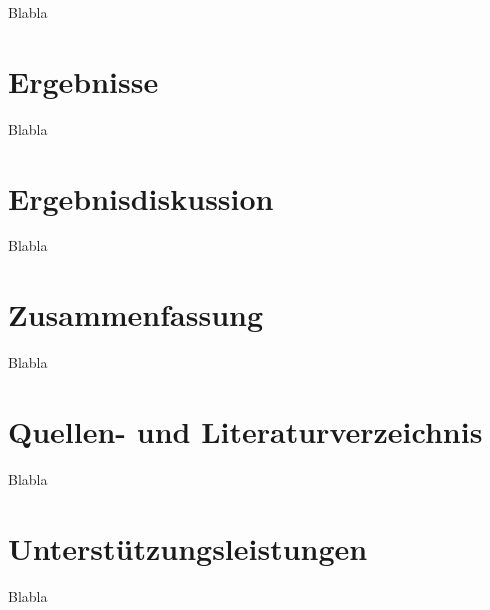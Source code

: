 \documentclass[11pt]{article}
\begin{document}
    Blabla


    \section{Ergebnisse}

    Blabla


    \section{Ergebnisdiskussion}

    Blabla


    \section{Zusammenfassung}

    Blabla


    \section{Quellen- und Literaturverzeichnis}

    Blabla


    \section{Unterstützungsleistungen}

    Blabla
\end{document}
